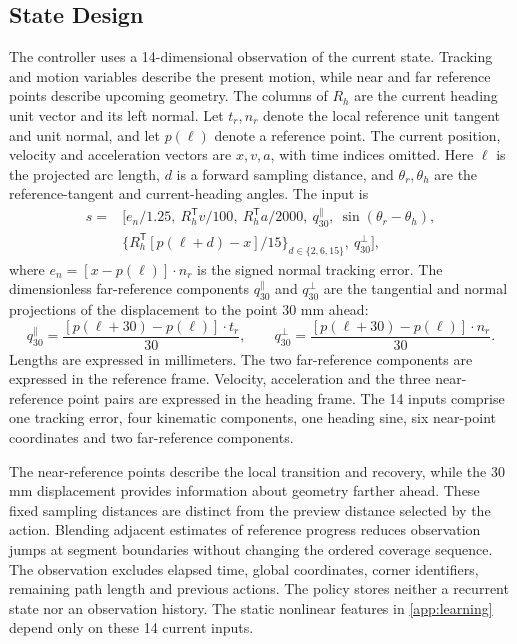 \documentclass[preprint,12pt,nonatbib]{elsarticle}
\begin{document}
\subsection{State Design}
The controller uses a 14-dimensional observation of the current state. Tracking and motion variables describe the present motion, while near and far reference points describe upcoming geometry. The columns of $R_h$ are the current heading unit vector and its left normal. Let $t_r,n_r$ denote the local reference unit tangent and unit normal, and let $p(\ell)$ denote a reference point. The current position, velocity and acceleration vectors are $x,v,a$, with time indices omitted. Here $\ell$ is the projected arc length, $d$ is a forward sampling distance, and $\theta_r,\theta_h$ are the reference-tangent and current-heading angles. The input is
\begin{equation}
\begin{split}
s={}&[e_n/1.25,\ R_h^{\mathsf T}v/100,\ R_h^{\mathsf T}a/2000,\ q_{30}^{\parallel},\ \sin(\theta_r-\theta_h),\\
&\{R_h^{\mathsf T}[p(\ell+d)-x]/15\}_{d\in\{2,6,15\}},\ q_{30}^{\perp}],
\end{split}
\label{eq:state14}
\end{equation}
where $e_n=[x-p(\ell)]\cdot n_r$ is the signed normal tracking error. The dimensionless far-reference components $q_{30}^{\parallel}$ and $q_{30}^{\perp}$ are the tangential and normal projections of the displacement to the point 30 mm ahead:
\begin{equation}
q_{30}^{\parallel}=\frac{[p(\ell+30)-p(\ell)]\cdot t_r}{30},\qquad
q_{30}^{\perp}=\frac{[p(\ell+30)-p(\ell)]\cdot n_r}{30}.
\end{equation}
Lengths are expressed in millimeters. The two far-reference components are expressed in the reference frame. Velocity, acceleration and the three near-reference point pairs are expressed in the heading frame. The 14 inputs comprise one tracking error, four kinematic components, one heading sine, six near-point coordinates and two far-reference components.

The near-reference points describe the local transition and recovery, while the 30 mm displacement provides information about geometry farther ahead. These fixed sampling distances are distinct from the preview distance selected by the action. Blending adjacent estimates of reference progress reduces observation jumps at segment boundaries without changing the ordered coverage sequence. The observation excludes elapsed time, global coordinates, corner identifiers, remaining path length and previous actions. The policy stores neither a recurrent state nor an observation history. The static nonlinear features in \ref{app:learning} depend only on these 14 current inputs.
\end{document}
